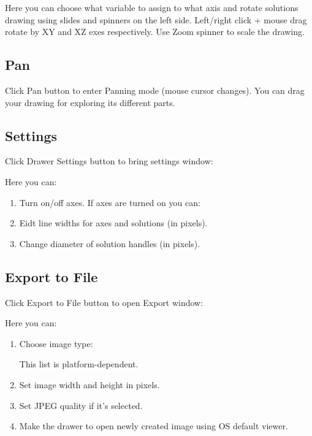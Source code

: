 \documentclass[12pt]{article}
\begin{document}
Here you can choose what variable to assign to what axis and 
rotate solutions drawing using slides and spinners on the left side. Left/right click + mouse drag
rotate by XY and XZ exes respectively. Use Zoom spinner to scale the drawing.


\subsection{Pan}

Click Pan button  to enter Panning mode (mouse cursor changes).
You can drag your drawing for exploring its different parts. 



\subsection{Settings}

Click Drawer Settings button  to bring settings window:


Here you can:
\begin{enumerate}
\item Turn on/off axes. If axes are turned on you can:
\item Eidt line widths for axes and solutions (in pixels). 
\item Change diameter of solution handles (in pixels).
\end{enumerate}



\subsection{Export to File}

Click Export to File button  to open Export window:


Here you can:
\begin{enumerate}
\item Choose image type:


This list is platform-dependent.
\item Set image width and height in pixels.
\item Set JPEG quality if it's selected.
\item Make the drawer to open newly created image using OS default viewer.
\end{enumerate}
\end{document}
